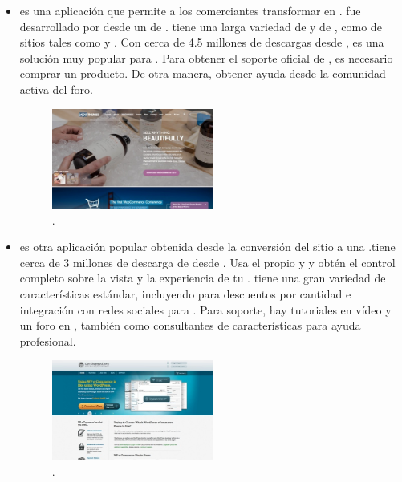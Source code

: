 \begin{itemize}
	\item \textbf{\nameWooCommerce} es una aplicación \ecommerce \freePC \openSourcePC que permite a los comerciantes transformar \wordPressNAME \sites en \stores. \nameWooCommerce fue desarrollado por \wooThemes desde un \fork de \nameJigoshop. \nameWooCommerce tiene una larga variedad de  \plugins y  \themes de \wooThemes, como de sitios \thirdParty tales como \themeForest \cite{online_ThemeForest} y \codeCanyon \cite{online_CodeCanyon}. Con cerca de 4.5 millones de descargas desde \wordPressOrg\cite{online_WordPress}, \nameWooCommerce es una solución \ecommerce muy popular para \wordPressNAME. Para obtener el soporte oficial de \wooThemes, es necesario comprar un producto. De otra manera, obtener ayuda desde la comunidad activa del foro.

	\begin{figure}[H]
		\centering
		\includegraphics[width=0.5\textwidth]{figuras/cap1/WooCommerceWebsite.jpg}
		\caption{\nameWooCommerce \websiteINT \cite{online_WooCommerce}.}
	\end{figure}

	\item \textbf{\nameWPECommerce} es otra aplicación popular obtenida desde la conversión del  sitio \wordPressNAME a una \ecommerce \store.\nameWPECommerce tiene cerca de 3 millones de descarga de \plugin desde \wordPressOrg\cite{online_WordPress}. Usa el propio \htmlNAME y \cssNAME y obtén el control completo sobre la vista y la experiencia de tu \online \store. \nameWPECommerce tiene una gran variedad de características estándar, incluyendo \multiTierPricing para descuentos por cantidad e integración con redes sociales para \marketing. Para soporte, hay tutoriales en vídeo y un foro en \wordPressOrg, también como consultantes de características para ayuda profesional.

	\begin{figure}[H]
		\centering
		\includegraphics[width=0.5\textwidth]{figuras/cap1/WPECommerceWebsite.jpg}
		\caption{\nameWPECommerce \websiteINT \cite{online_WPECommerce}.}
	\end{figure}


\end{itemize}

